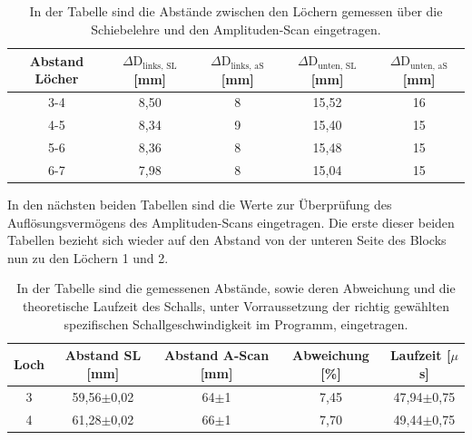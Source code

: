 \documentclass[titlepage = firstcover]{scrartcl}
\begin{document}
            \begin{table}[h]
              \centering
              \caption{In der Tabelle sind die Abstände zwischen den Löchern gemessen über die Schiebelehre und den Amplituden-Scan eingetragen.}
              \label{tab:Lochdistanzen}

              \begin{tabular}{c c c c c}
                  \toprule
                  {Abstand Löcher} & {$\Delta \text{D}_{\text{links, SL}}$ [mm]} & {$\Delta \text{D}_{\text{links, aS}}$ [mm]} & {$\Delta \text{D}_{\text{unten, SL}}$ [mm]} & {$\Delta \text{D}_{\text{unten, aS}}$ [mm]}  \\
                  \midrule
                  3-4   &   8,50   &   8  &   15,52    &  16   \\
                  4-5   &   8,34   &   9  &   15,40    &  15   \\
                  5-6   &   8,36   &   8  &   15,48    &  15   \\
                  6-7   &   7,98   &   8  &   15,04    &  15   \\
                  \bottomrule
              \end{tabular}

            \end{table}

            \FloatBarrier
            \noindent




            \newpage
            In den nächsten beiden Tabellen sind die Werte zur Überprüfung des Auflösungsvermögens des Amplituden-Scans eingetragen. Die erste dieser beiden Tabellen bezieht sich wieder auf den Abstand 
            von der unteren Seite des Blocks nun zu den Löchern 1 und 2.

            \begin{table}[h]
              \centering
              \caption{In der Tabelle sind die gemessenen Abstände, sowie deren Abweichung und die theoretische Laufzeit des Schalls, unter Vorraussetzung der richtig gewählten spezifischen Schallgeschwindigkeit im Programm, eingetragen.}
              \label{tab:Auflösung1}

              \begin{tabular}{c c c c c}
                  \toprule
                  {Loch} & {Abstand SL [mm]} & {Abstand A-Scan [mm]} & {Abweichung [\%]} & {Laufzeit [$\mu$s]}  \\
                  \midrule
                  3   &   59,56$\pm$0,02   &   64$\pm$1  &   7,45    &   47,94$\pm$0,75   \\
                  4   &   61,28$\pm$0,02   &   66$\pm$1  &   7,70    &   49,44$\pm$0,75   \\   
                  \bottomrule
              \end{tabular}

            \end{table}
\end{document}
